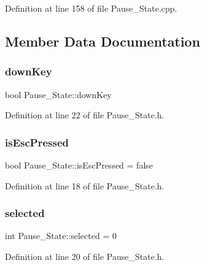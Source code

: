 Definition at line 158 of file Pause\+\_\+\+State.\+cpp.



\subsection{Member Data Documentation}
\hypertarget{class_pause___state_ae6e77f0b19c4adc1952b23e3283fecca}{}\label{class_pause___state_ae6e77f0b19c4adc1952b23e3283fecca} 
\subsubsection{\texorpdfstring{down\+Key}{downKey}}
{\footnotesize\ttfamily bool Pause\+\_\+\+State\+::down\+Key}



Definition at line 22 of file Pause\+\_\+\+State.\+h.

\hypertarget{class_pause___state_a5872683e6f94aefd3f90aeb48ae18471}{}\label{class_pause___state_a5872683e6f94aefd3f90aeb48ae18471} 
\subsubsection{\texorpdfstring{is\+Esc\+Pressed}{isEscPressed}}
{\footnotesize\ttfamily bool Pause\+\_\+\+State\+::is\+Esc\+Pressed = false}



Definition at line 18 of file Pause\+\_\+\+State.\+h.

\hypertarget{class_pause___state_a5c3854015d1a6ba73fab77dc80e1e9c6}{}\label{class_pause___state_a5c3854015d1a6ba73fab77dc80e1e9c6} 
\subsubsection{\texorpdfstring{selected}{selected}}
{\footnotesize\ttfamily int Pause\+\_\+\+State\+::selected = 0}



Definition at line 20 of file Pause\+\_\+\+State.\+h.

\hypertarget{class_pause___state_ad1230758796aa11cc0e8f4bc46802f41}{}\label{class_pause___state_ad1230758796aa11cc0e8f4bc46802f41} 
